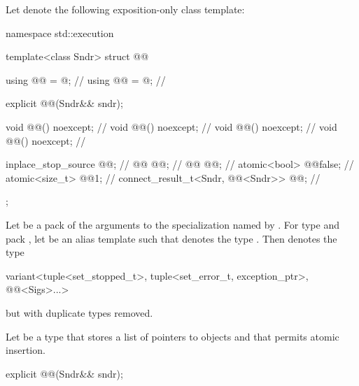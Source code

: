 \pnum
Let  denote the following exposition-only class template:
\begin{codeblock}
namespace std::execution {
  template<class Sndr>
  struct @@ {
    using @@ = @\seebelow@;                             // \expos
    using @@ = @\seebelow@;                          // \expos

    explicit @@(Sndr&& sndr);

    void @@() noexcept;                                   // \expos
    void @@() noexcept;                                     // \expos
    void @@() noexcept;                                    // \expos
    void @@() noexcept;                                    // \expos

    inplace_stop_source @@{};                             // \expos
    @@ @@{};                                      // \expos
    @@ @@;                             // \expos
    atomic<bool> @@{false};                              // \expos
    atomic<size_t> @@{1};                                // \expos
    connect_result_t<Sndr, @@<Sndr>> @@;      // \expos
  };
}
\end{codeblock}

\pnum
Let  be a pack of the arguments
to the  specialization
named by .
For type  and pack ,
let  be an alias template
such that  denotes
the type .
Then  denotes the type
\begin{codeblock}
variant<tuple<set_stopped_t>, tuple<set_error_t, exception_ptr>, @@<Sigs>...>
\end{codeblock}
but with duplicate types removed.

\pnum
Let  be a type
that stores a list of pointers to  objects and
that permits atomic insertion.

\begin{itemdecl}
explicit @@(Sndr&& sndr);
\end{itemdecl}

